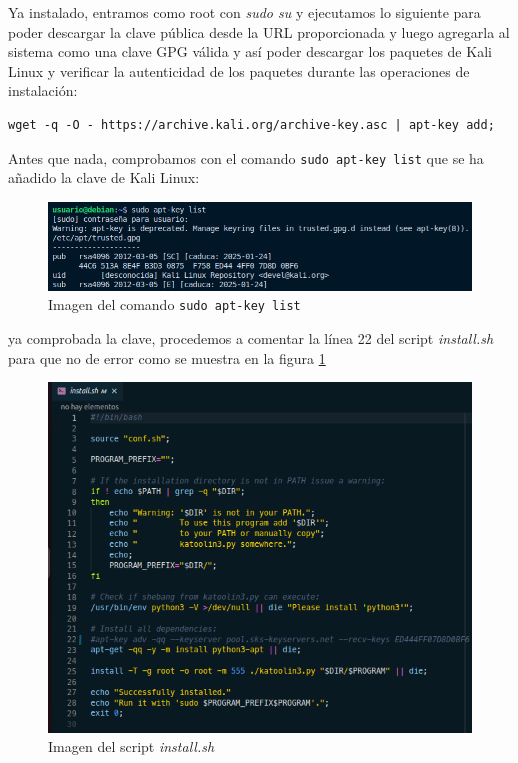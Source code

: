\documentclass[11pt]{report}
\begin{document}
Ya instalado, entramos como root con \emph{sudo su} y ejecutamos lo siguiente para poder descargar la clave pública desde la URL proporcionada y luego agregarla 
al sistema como una clave GPG válida y así poder descargar los paquetes de Kali Linux y verificar la autenticidad de los paquetes durante las operaciones de instalación:
\begin{verbatim}
wget -q -O - https://archive.kali.org/archive-key.asc | apt-key add;
\end{verbatim}

Antes que nada, comprobamos con el comando \texttt{sudo apt-key list} que se ha añadido la clave de Kali Linux:
\begin{figure}[H]
  \centering
  \includegraphics[scale=0.5]{img/apt-key_list.png}
  \caption{Imagen del comando \texttt{sudo apt-key list}}
\end{figure}

ya comprobada la clave, procedemos a comentar la línea 22 del script \emph{install.sh} para que no de error como se muestra en la figura \ref{fig:script}
\begin{figure}[H]
  \centering
  \includegraphics[scale=0.4]{img/comment_script.png}
  \caption{Imagen del script \emph{install.sh}}
  \label{fig:script}
\end{figure}
\end{document}
